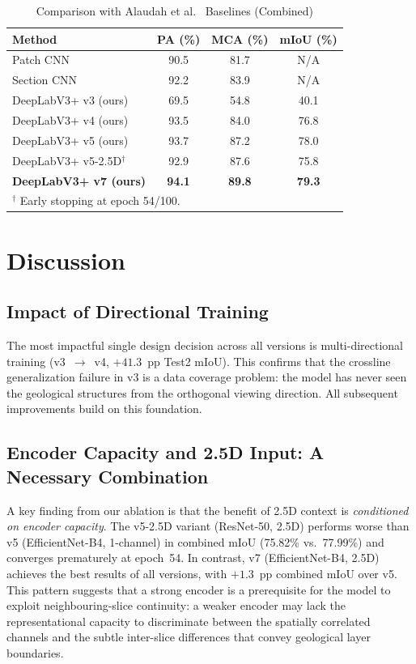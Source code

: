 \documentclass[journal]{IEEEtran}
\begin{document}
\begin{table}[!t]
\caption{Comparison with Alaudah et al.~\cite{alaudah2019} Baselines (Combined)}
\label{tab:baseline}
\centering
\begin{tabular}{lccc}
\toprule
Method & PA (\%) & MCA (\%) & mIoU (\%) \\
\midrule
Patch CNN~\cite{alaudah2019}    & 90.5 & 81.7 & N/A \\
Section CNN~\cite{alaudah2019}  & 92.2 & 83.9 & N/A \\
DeepLabV3+ v3 (ours) & 69.5 & 54.8 & 40.1 \\
DeepLabV3+ v4 (ours) & 93.5 & 84.0 & 76.8 \\
DeepLabV3+ v5 (ours) & 93.7 & 87.2 & 78.0 \\
DeepLabV3+ v5-2.5D$^\dagger$ & 92.9 & 87.6 & 75.8 \\
\textbf{DeepLabV3+ v7 (ours)} & \textbf{94.1} & \textbf{89.8} & \textbf{79.3} \\
\midrule
\multicolumn{4}{l}{$^\dagger$ Early stopping at epoch 54/100.} \\
\bottomrule
\end{tabular}
\end{table}

\section{Discussion}
\label{sec:discussion}

\subsection{Impact of Directional Training}

The most impactful single design decision across all versions is multi-directional training (v3~$\to$~v4, $+41.3$~pp Test2 mIoU). This confirms that the crossline generalization failure in v3 is a data coverage problem: the model has never seen the geological structures from the orthogonal viewing direction. All subsequent improvements build on this foundation.

\subsection{Encoder Capacity and 2.5D Input: A Necessary Combination}

A key finding from our ablation is that the benefit of 2.5D context is \emph{conditioned on encoder capacity}. The v5-2.5D variant (ResNet-50, 2.5D) performs worse than v5 (EfficientNet-B4, 1-channel) in combined mIoU (75.82\% vs.\ 77.99\%) and converges prematurely at epoch~54. In contrast, v7 (EfficientNet-B4, 2.5D) achieves the best results of all versions, with $+1.3$~pp combined mIoU over v5. This pattern suggests that a strong encoder is a prerequisite for the model to exploit neighbouring-slice continuity: a weaker encoder may lack the representational capacity to discriminate between the spatially correlated channels and the subtle inter-slice differences that convey geological layer boundaries.
\end{document}
